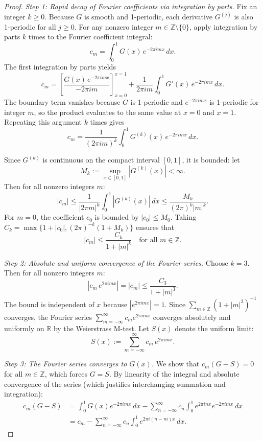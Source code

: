 \begin{proof}
\medskip
\noindent\textit{Step 1: Rapid decay of Fourier coefficients via integration by parts.} Fix an integer $k \geq 0$. Because $G$ is smooth and 1-periodic, each derivative $G^{(j)}$ is also 1-periodic for all $j \geq 0$. For any nonzero integer $m \in \mathbb{Z} \setminus \{0\}$, apply integration by parts $k$ times to the Fourier coefficient integral:
$$c_m = \int_0^1 G(x) \, e^{-2\pi i m x} \, dx.$$
The first integration by parts yields
$$c_m = \left[ \frac{G(x) \, e^{-2\pi i m x}}{-2\pi i m} \right]_{x=0}^{x=1} + \frac{1}{2\pi i m} \int_0^1 G'(x) \, e^{-2\pi i m x} \, dx.$$
The boundary term vanishes because $G$ is 1-periodic and $e^{-2\pi i m x}$ is 1-periodic for integer $m$, so the product evaluates to the same value at $x = 0$ and $x = 1$. Repeating this argument $k$ times gives
$$c_m = \frac{1}{(2\pi i m)^k} \int_0^1 G^{(k)}(x) \, e^{-2\pi i m x} \, dx.$$

Since $G^{(k)}$ is continuous on the compact interval $[0,1]$, it is bounded: let
$$M_k := \sup_{x \in [0,1]} |G^{(k)}(x)| < \infty.$$
Then for all nonzero integers $m$:
$$|c_m| \leq \frac{1}{|2\pi m|^k} \int_0^1 |G^{(k)}(x)| \, dx \leq \frac{M_k}{(2\pi)^k |m|^k}.$$
For $m = 0$, the coefficient $c_0$ is bounded by $|c_0| \leq M_0$. Taking $C_k = \max\{1 + |c_0|, (2\pi)^{-k}(1+M_k)\}$ ensures that
$$|c_m| \leq \frac{C_k}{1 + |m|^k} \quad \text{for all } m \in \mathbb{Z}.$$

\medskip
\noindent\textit{Step 2: Absolute and uniform convergence of the Fourier series.} Choose $k = 3$. Then for all nonzero integers $m$:
$$|c_m \, e^{2\pi i m x}| = |c_m| \leq \frac{C_3}{1 + |m|^3}.$$
The bound is independent of $x$ because $|e^{2\pi i m x}| = 1$. Since $\sum_{m \in \mathbb{Z}} (1+|m|^3)^{-1}$ converges, the Fourier series $\sum_{m=-\infty}^\infty c_m e^{2\pi i m x}$ converges absolutely and uniformly on $\mathbb{R}$ by the Weierstrass M-test. Let $S(x)$ denote the uniform limit:
$$S(x) := \sum_{m=-\infty}^{\infty} c_m \, e^{2\pi i m x}.$$

\medskip
\noindent\textit{Step 3: The Fourier series converges to $G(x)$.} We show that $c_m(G - S) = 0$ for all $m \in \mathbb{Z}$, which forces $G = S$. By linearity of the integral and absolute convergence of the series (which justifies interchanging summation and integration):
$$\begin{aligned}
c_m(G - S) &= \int_0^1 G(x) e^{-2\pi i m x} \, dx - \sum_{n=-\infty}^\infty c_n \int_0^1 e^{2\pi i n x} e^{-2\pi i m x} \, dx \\
&= c_m - \sum_{n=-\infty}^\infty c_n \int_0^1 e^{2\pi i (n-m) x} \, dx.
\end{aligned}$$


\end{proof}
